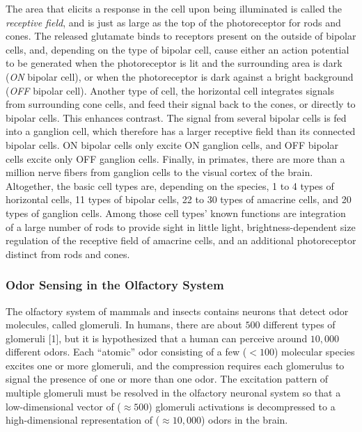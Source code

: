 The area that elicits a response in the cell upon being illuminated
is called the \emph{receptive field}, and
is just as large as the top of the photoreceptor for rods and cones.
The released glutamate binds to receptors present on the outside of
bipolar cells, and, depending on the type of bipolar cell, cause either
an action potential to be generated when the photoreceptor is lit
and the surrounding area is dark (\emph{ON }bipolar cell), or when
the photoreceptor is dark against a bright background (\emph{OFF }bipolar
cell). Another type of cell, the horizontal cell integrates signals
from surrounding cone cells, and feed their signal back to the cones,
or directly to bipolar cells. This enhances contrast. The signal from
several bipolar cells is fed into a ganglion cell, which therefore
has a larger receptive field than its connected bipolar cells. ON
bipolar cells only excite ON ganglion cells, and OFF bipolar cells
excite only OFF ganglion cells. Finally, in primates, there are more
than a million nerve fibers from ganglion cells to the visual cortex
of the brain. Altogether, the basic cell types are, depending on the
species, 1 to 4 types of horizontal cells, 11 types of bipolar cells,
22 to 30 types of amacrine cells, and 20 types of ganglion cells.
Among those cell types' known functions are integration of a large
number of rods to provide sight in little light, brightness-dependent
size regulation of the receptive field of amacrine cells, and an additional
photoreceptor distinct from rods and cones\cite{Kolb2003}.


\subsubsection{Odor Sensing in the Olfactory System}

The olfactory system of mammals and insects contains neurons that
detect odor molecules, called glomeruli\cite{ZhangSharpee2016}. In
humans, there are about $500$ different types of glomeruli {[}1{]},
but it is hypothesized that a human can perceive around $10,000$
different odors. Each ``atomic'' odor consisting of a few ($<100$)
molecular species excites one or more glomeruli, and the compression
requires each glomerulus to signal the presence of one or more than
one odor. The excitation pattern of multiple glomeruli must be resolved
in the olfactory neuronal system so that a low-dimensional vector
of ($\approx500$) glomeruli activations is decompressed to a high-dimensional
representation of ($\approx10,000$) odors in the brain.

